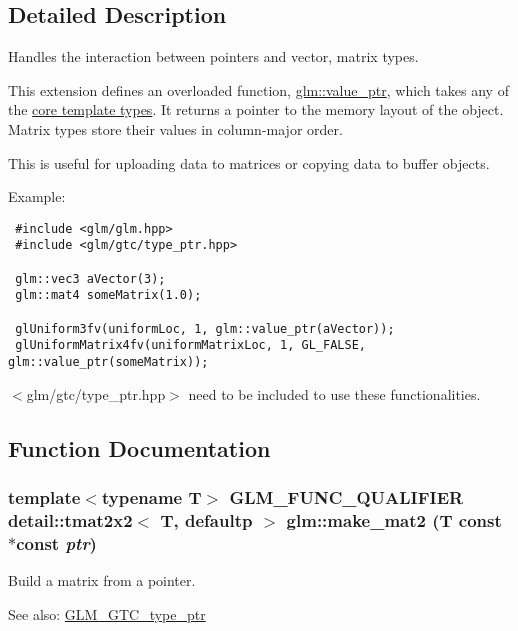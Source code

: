 \subsection{Detailed Description}
Handles the interaction between pointers and vector, matrix types. 

This extension defines an overloaded function, \hyperlink{group__gtc__type__ptr_g87d5cb613f75f83973609ccb8922200b}{glm::value\_\-ptr}, which takes any of the \hyperlink{group__core__template}{core template types}. It returns a pointer to the memory layout of the object. Matrix types store their values in column-major order.

This is useful for uploading data to matrices or copying data to buffer objects.

Example: 

\begin{Code}\begin{verbatim} #include <glm/glm.hpp>
 #include <glm/gtc/type_ptr.hpp>
 
 glm::vec3 aVector(3);
 glm::mat4 someMatrix(1.0);
 
 glUniform3fv(uniformLoc, 1, glm::value_ptr(aVector));
 glUniformMatrix4fv(uniformMatrixLoc, 1, GL_FALSE, glm::value_ptr(someMatrix));
\end{verbatim}
\end{Code}



$<$glm/gtc/type\_\-ptr.hpp$>$ need to be included to use these functionalities. 

\subsection{Function Documentation}
\hypertarget{group__gtc__type__ptr_g08f35700be4d2e627da4d894edfa1b60}{
\subsubsection[make\_\-mat2]{\setlength{\rightskip}{0pt plus 5cm}template$<$typename T$>$ GLM\_\-FUNC\_\-QUALIFIER detail::tmat2x2$<$ T, defaultp $>$ glm::make\_\-mat2 (T const $\ast$const  {\em ptr})}}
\label{group__gtc__type__ptr_g08f35700be4d2e627da4d894edfa1b60}


Build a matrix from a pointer. \begin{Desc}
\item[See also:]\hyperlink{group__gtc__type__ptr}{GLM\_\-GTC\_\-type\_\-ptr} \end{Desc}


